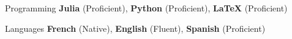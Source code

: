 

\begin{cvskills}

    \cvskill
    {Programming} %
    {\textbf{Julia} (Proficient), \textbf{Python} (Proficient), \textbf{LaTeX} (Proficient)} %

    \cvskill
    {Languages} %
    {\textbf{French} (Native), \textbf{English} (Fluent), \textbf{Spanish} (Proficient)} %

\end{cvskills}
